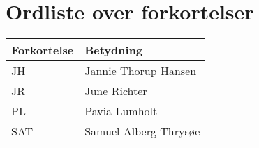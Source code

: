 \section{Ordliste over forkortelser}

\vspace{1cm}
\begin{table}[hbt]
\centering
\label{ordliste}
\begin{tabular}{|l|l|}
\hline
\textbf{Forkortelse             } & \textbf{Betydning             } \\ \hline
JH & Jannie Thorup Hansen \\ \hline
JR & June Richter  \\ \hline
PL & Pavia Lumholt \\ \hline
SAT & Samuel Alberg Thrysøe \\ \hline
\end{tabular}
\end{table}